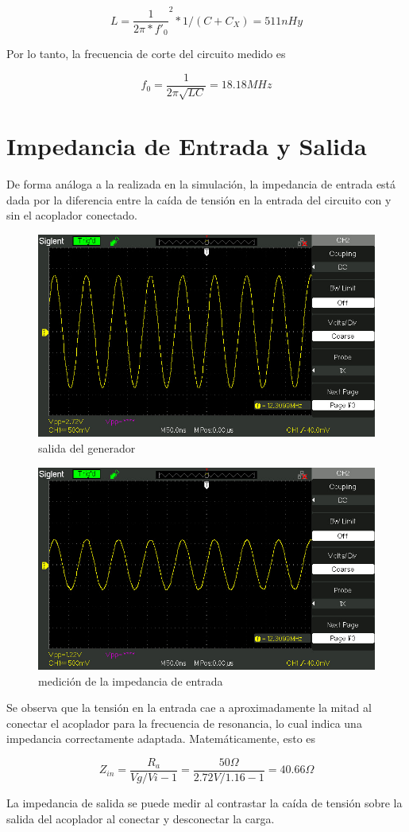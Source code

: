 $$
L = {\frac{1}{2\pi*f'_0}}^2*1/(C+C_X) = 511nHy
$$

Por lo tanto, la frecuencia de corte del circuito medido es

$$
f_0 = \frac{1}{2\pi\sqrt{LC}} = 18.18 MHz
$$

\section{Impedancia de Entrada y Salida}

De forma análoga a la realizada en la simulación, la impedancia de entrada está dada por la diferencia entre la caída de tensión en la entrada del circuito con y sin el acoplador conectado.

\begin{figure}[H]
    \centering
    \includegraphics[width=0.5\linewidth]{oscilo/SDS00010.jpg}
    \caption{salida del generador}
    \label{fig:enter-label}
\end{figure}

\begin{figure}[H]
    \centering
    \includegraphics[width=0.5\linewidth]{oscilo/SDS00011.jpg}
    \caption{medición de la impedancia de entrada}
    \label{fig:enter-label}
\end{figure}

Se observa que la tensión en la entrada cae a aproximadamente la mitad al conectar el acoplador para la frecuencia de resonancia, lo cual indica una impedancia correctamente adaptada. Matemáticamente, esto es

$$
Z_{in} = \frac{R_a}{Vg/Vi-1} = \frac{50\Omega}{2.72V/1.16-1} = 40.66\Omega
$$

La impedancia de salida se puede medir al contrastar la caída de tensión sobre la salida del acoplador al conectar y desconectar la carga.

